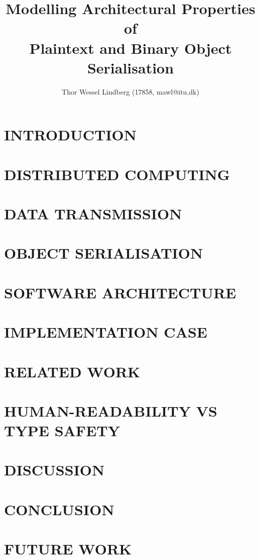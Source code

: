 \documentclass[10pt, twocolumn, letterpaper]{article}
\title{
    \vspace{-0.5cm}
    \huge \textbf{Modelling Architectural Properties of}  \\
    \huge \textbf{Plaintext and Binary Object Serialisation}  \\
}
\author{Thor Wessel Lindberg (17858, mawl@itu.dk)}
\date{}
\begin{document}
\maketitle



\section{INTRODUCTION}


\section{DISTRIBUTED COMPUTING} %


\section{DATA TRANSMISSION} %


\section{OBJECT SERIALISATION} %


\section{SOFTWARE ARCHITECTURE} %


\section{IMPLEMENTATION CASE} %


\section{RELATED WORK} %


\section{HUMAN-READABILITY VS TYPE SAFETY} %


\section{DISCUSSION}


\section{CONCLUSION}


\section{FUTURE WORK}



\end{document}
